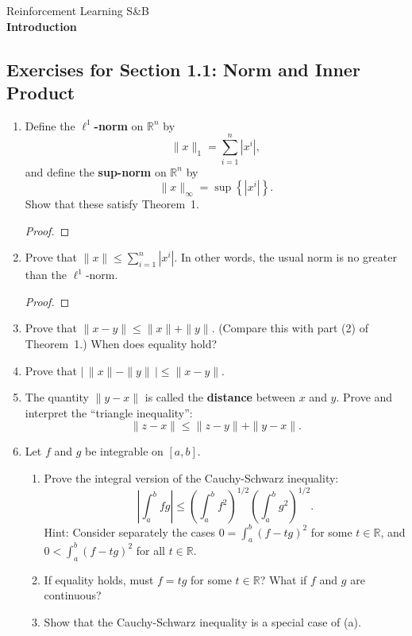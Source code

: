 \documentclass[]{book}
\theoremstyle{definition}
\newcommand{\bb}[1]{\mathbb{#1}}
\newcommand{\R}{\bb{R}}
\newcommand{\textdf}[1]{\textbf{\textsf{#1}}\index{#1}}
\newcommand{\ds}{\displaystyle}
\begin{document}
\begin{center}
{\Large Reinforcement Learning \hspace{0.5cm} S\&B}\\
\textbf{Introduction}\\ %
\end{center}

\vspace{0.2 cm}


\subsection*{Exercises for Section 1.1: Norm and Inner Product}

\begin{enumerate}
\item\label{norms}
Define the \textdf{$\ell^1$-norm} on $\R^n$ by
	$$\|x\|_1 = \sum_{i=1}^n |x^i|,$$
	and define the \textdf{sup-norm} on $\R^n$ by
	$$\|x\|_\infty = \sup\left\{|x^i|\right\}.$$
	Show that these satisfy Theorem~1.
\begin{proof}
\end{proof}

\item	Prove that $\ds \|x\|\leq \sum_{i=1}^n |x^i|$.  In other words, the usual norm is no greater than the $\ell^1$-norm.
\begin{proof}
\end{proof}

\item	Prove that $\|x-y\| \leq \|x\| + \|y\|$.  (Compare this with part (2) of
	Theorem~1.)  When does equality hold?

\item	Prove that $\ds \bigg| \, \|x\|-\|y\| \, \bigg| \leq \|x-y\|$.

\item	The quantity $\|y-x\|$ is called the \textdf{distance} between $x$ and
$y$.  Prove and interpret the ``triangle inequality'':
$$\|z-x\| \leq \|z-y\| + \|y-x\|.$$

\item\label{caushw}	Let $f$ and $g$ be integrable on $[a,b]$.
\begin{enumerate}
	\item	Prove the integral version of the Cauchy-Schwarz inequality:
	$$\left|\int_a^b fg\right| \leq \left(\int_a^b
	f^2\right)^{1/2}\left(\int_a^b g^2\right)^{1/2}.$$
	Hint:  Consider separately the cases $0 = \int_a^b(f-t g)^2$ for
	some $t\in\R$, and $0<\int_a^b(f-t g)^2$ for all
	$t\in\R$.
	\item	If equality holds, must $f=t g$ for some $t\in\R$? 
	What if $f$ and $g$ are continuous?
	\item	Show that the Cauchy-Schwarz inequality is a special case of
	(a).


\end{enumerate}
\end{enumerate}
\end{document}
